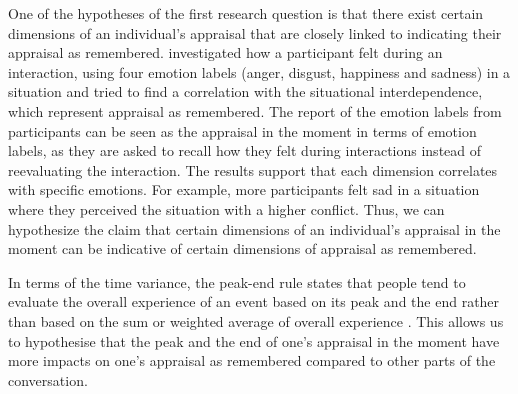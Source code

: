 One of the hypotheses of the first research question is that there exist certain dimensions of an individual's appraisal that are closely linked to indicating their appraisal as remembered. \citeauthor{gerpott2017howdopeople} \cite{gerpott2017howdopeople} investigated how a participant felt during an interaction, using four emotion labels (anger, disgust, happiness and sadness) in a situation and tried to find a correlation with the situational interdependence, which represent appraisal as remembered. The report of the emotion labels from participants can be seen as the appraisal in the moment in terms of emotion labels, as they are asked to recall how they felt during interactions instead of reevaluating the interaction. The results support that each dimension correlates with specific emotions. For example, more participants felt sad in a situation where they perceived the situation with a higher conflict. Thus, we can hypothesize the claim that certain dimensions of an individual's appraisal in the moment can be indicative of certain dimensions of appraisal as remembered. 

In terms of the time variance, the peak-end rule states that people tend to evaluate the overall experience of an event based on its peak and the end rather than based on the sum or weighted average of overall experience \cite{kahneman2000evaluation}. This allows us to hypothesise that the peak and the end of one's appraisal in the moment have more impacts on one's appraisal as remembered compared to other parts of the conversation. 
